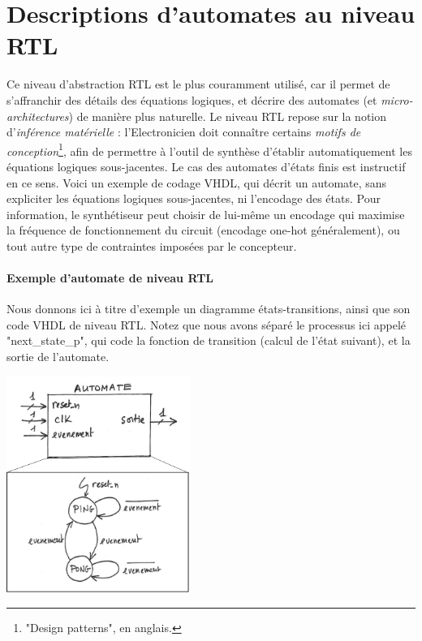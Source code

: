 \documentclass[a4paper,11pt]{article}
\begin{document}
\section{Descriptions d'automates au niveau RTL}

Ce niveau d'abstraction RTL est le plus couramment utilisé, car il permet de
s'affranchir des détails des équations logiques, et décrire des automates (et {\it micro-architectures}) de manière plus naturelle.
Le niveau RTL repose sur la notion d'{\it inférence matérielle} : l'Electronicien doit connaître certains {\it motifs de conception}\footnote{"Design patterns", en anglais.}, afin
de permettre à l'outil de synthèse d'établir automatiquement les équations logiques sous-jacentes.
Le cas des automates d'états finis est instructif en ce sens. Voici un exemple
de codage VHDL, qui décrit un automate, sans expliciter les équations logiques sous-jacentes, ni l'encodage des états.
Pour information, le synthétiseur peut choisir de lui-même un encodage qui
maximise la fréquence de fonctionnement du circuit (encodage one-hot généralement),
ou tout autre type de contraintes imposées par le concepteur.

\paragraph{Exemple d'automate de niveau RTL}

Nous donnons ici à titre d'exemple un diagramme états-transitions, ainsi que son code VHDL de niveau RTL.
Notez que nous avons séparé le processus ici appelé "next\_state\_p", qui code
la fonction de transition (calcul de l'état suivant), et la sortie de l'automate.
\begin{center}
   \begin{minipage}[t]{8cm}
     \vspace{0pt}
     \lstset{inputencoding=utf8}
     
   \end{minipage}%
   \begin{minipage}[t]{7cm}
     \vspace{40pt}
     \centering
     \includegraphics[width=6cm]{./ent_arch_ping_pong.png}
   \end{minipage}
\end{center} %
\end{document}
